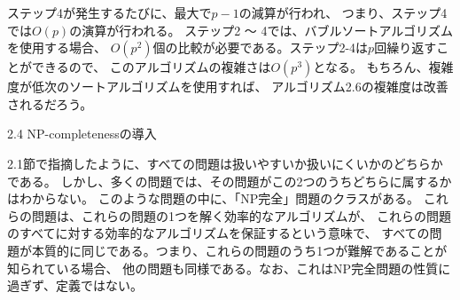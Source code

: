 
ステップ4が発生するたびに、最大で$p-1$の減算が行われ、
つまり、ステップ4では$O(p)$の演算が行われる。
ステップ2 ～ 4では、バブルソートアルゴリズムを使用する場合、
$O(p^2)$個の比較が必要である。ステップ2-4は$p$回繰り返すことができるので、
このアルゴリズムの複雑さは$O(p^3)$となる。
もちろん、複雑度が低次のソートアルゴリズムを使用すれば、
アルゴリズム2.6の複雑度は改善されるだろう。

2.4 NP-completenessの導入

2.1節で指摘したように、すべての問題は扱いやすいか扱いにくいかのどちらかである。
しかし、多くの問題では、その問題がこの2つのうちどちらに属するかはわからない。
このような問題の中に、「NP完全」問題のクラスがある。
これらの問題は、これらの問題の1つを解く効率的なアルゴリズムが、
これらの問題のすべてに対する効率的なアルゴリズムを保証するという意味で、
すべての問題が本質的に同じである。つまり、これらの問題のうち1つが難解であることが知られている場合、
他の問題も同様である。なお、これはNP完全問題の性質に過ぎず、定義ではない。